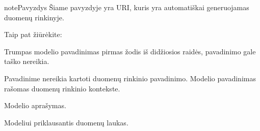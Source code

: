 \documentclass[letterpaper,10pt,lithuanian]{sphinxmanual}
\begin{document}
\begin{fulllineitems}
\begin{sphinxadmonition}{note}{Pavyzdys}
\sphinxAtStartPar
Šiame pavyzdyje  yra URI, kuris yra automatiškai
generuojamas  duomenų rinkinyje.
\end{sphinxadmonition}


\begin{sphinxseealso}{Taip pat žiūrėkite:}

\sphinxAtStartPar
{\hyperref[\detokenize{zodynai:vocab}]{}}


\end{sphinxseealso}


\end{fulllineitems}


\begin{fulllineitems}
\label{\detokenize{dimensijos:model.title}}
\pysigstartsignatures
\pysigline
{}
\pysigstopsignatures
\sphinxAtStartPar
Trumpas modelio pavadinimas pirmas žodis iš didžiosios raidės, pavadinimo
gale taško nereikia.

\sphinxAtStartPar
Pavadinime nereikia kartoti duomenų rinkinio pavadinimo. Modelio
pavadinimas rašomas duomenų rinkinio kontekste.

\end{fulllineitems}


\begin{fulllineitems}
\label{\detokenize{dimensijos:model.description}}
\pysigstartsignatures
\pysigline
{}
\pysigstopsignatures
\sphinxAtStartPar
Modelio aprašymas.

\end{fulllineitems}


\begin{fulllineitems}
\label{\detokenize{dimensijos:model.property}}
\pysigstartsignatures
\pysigline
{}
\pysigstopsignatures
\sphinxAtStartPar
Modeliui priklausantis duomenų laukas.

\end{fulllineitems}
\end{document}
